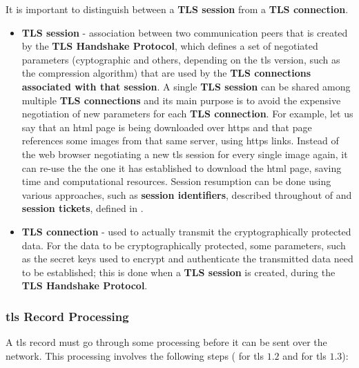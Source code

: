 \documentclass{llncs}
\begin{document}
It is important to distinguish between a \textbf{TLS session} from a \textbf{TLS connection}.
\begin{itemize}
  \item \textbf{TLS session} - association between two communication peers that is
  created by the \textbf{TLS Handshake Protocol}, which defines a set of negotiated parameters
  (cyptographic and others, depending on the \gls{tls} version, such as
  the compression algorithm) that are used by the \textbf{TLS connections associated
  with that session}. A single \textbf{TLS session} can be shared among multiple
  \textbf{TLS connections} and its main purpose is to avoid the expensive negotiation
  of new parameters for each \textbf{TLS connection}. For example, let us say
  that an \gls{html} page is being downloaded over \gls{https} and that page references some images from that same server, using \gls{https} links. Instead of the web browser negotiating a new \gls{tls} session for every single image again, it can re-use the the
  one it has established to download the \gls{html} page,
  saving time and computational resources. Session resumption can be done using various
  approaches, such as \textbf{session identifiers}, described throughout 
  of \cite{RFC5246} and \textbf{session tickets}, defined in
  \cite{RFC5077}.
  \item \textbf{TLS connection} - used to actually transmit the cryptographically
  protected data. For the data to be cryptographically protected, some parameters,
  such as the secret keys used to encrypt and authenticate the transmitted
  data need to be established; this is done when a \textbf{TLS session} is created,
  during the \textbf{TLS Handshake Protocol}.
\end{itemize}

\subsubsection{\gls{tls} Record Processing}
A \gls{tls} record must go through some processing before it can be sent over the network.
This processing involves the following steps ( for \gls{tls} $1.2$ and  for \gls{tls} $1.3$):
\end{document}
